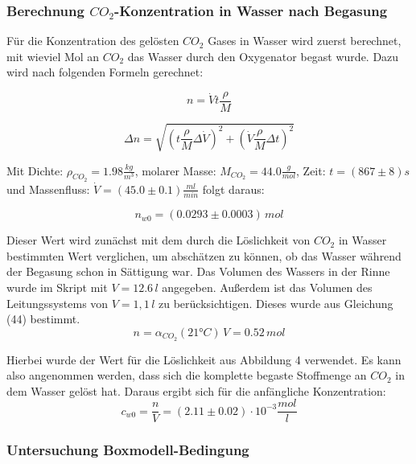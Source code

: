 \documentclass[12pt]{article}
\begin{document}
\subsubsection{Berechnung $CO_2$-Konzentration in Wasser nach Begasung}

Für die Konzentration des gelösten $CO_2$ Gases in Wasser wird zuerst berechnet, mit wieviel Mol an $CO_2$ das Wasser durch den Oxygenator begast wurde. Dazu wird nach folgenden Formeln gerechnet:

\begin{equation}
n = \dot V t \frac{\rho}{M}
\end{equation}

\begin{equation}
\Delta n = \sqrt{(t \frac{\rho}{M} \Delta \dot V)^{2}+(\dot V \frac{\rho}{M} \Delta t)^{2}}
\end{equation}

Mit Dichte: $\rho_{CO_2} = 1.98 \frac{kg}{m^3} $, molarer Masse: $M_{CO_2} = 44.0\frac{g}{mol} $, Zeit:  $t = (867 \pm 8)s$ und Massenfluss: $\dot V = (45.0 \pm 0.1)\frac{ml}{min}$ folgt daraus:

\begin{equation}
n_{w0} = (0.0293 \pm 0.0003) \,mol
\end{equation}

Dieser Wert wird zun\"achst mit dem durch die Löslichkeit von $CO_2$ in Wasser bestimmten Wert verglichen, um absch\"atzen zu können, ob das Wasser w\"ahrend der Begasung schon in S\"attigung war. Das Volumen des Wassers in der Rinne wurde im Skript mit $V = 12.6 \,l $ angegeben. Außerdem ist das Volumen des Leitungssystems von $V=1,1 \,l $ zu ber\"ucksichtigen. Dieses wurde aus Gleichung (44) \cite{jaehne} bestimmt.
\begin{equation}
n = \alpha_{CO_2}(21 °C) \, V = 0.52 \, mol
\end{equation}

Hierbei wurde der Wert für die L\"oslichkeit aus Abbildung 4 \cite{jaehne} verwendet. Es kann also angenommen werden, dass sich die komplette begaste Stoffmenge an $CO_2$ in dem Wasser gelöst hat. Daraus ergibt sich für die anfängliche Konzentration:
\begin{equation}
c_{w0} = \frac{n}{V} = (2.11 \pm 0.02)\cdot 10^{-3} \frac{mol}{l}
\end{equation}

\subsubsection{Untersuchung Boxmodell-Bedingung}
\end{document}
